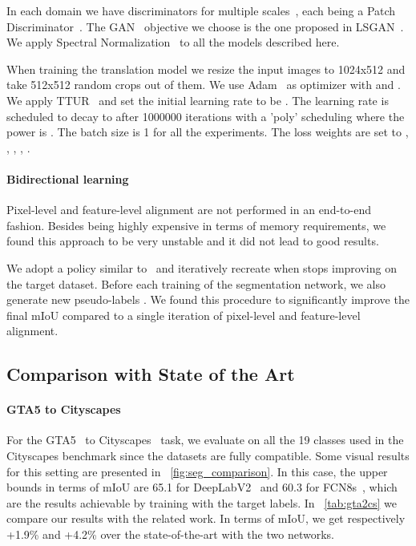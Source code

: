 \documentclass{bmvc2k}
\begin{document}
In each domain we have discriminators for multiple scales~\cite{pix2pixhd}, each being a Patch Discriminator~\cite{pix2pix, li2016precomputed}. The GAN~\cite{gan} objective we choose is the one proposed in LSGAN~\cite{lsgan}. We apply Spectral Normalization~\cite{spectralnorm} to all the models described here.

When training the translation model we resize the input images to 1024x512 and take 512x512 random crops out of them. We use Adam~\cite{adam} as optimizer with  and . We apply TTUR~\cite{ttur} and set the initial learning rate to be . The learning rate is scheduled to decay to  after 1000000 iterations with a 'poly' scheduling where the power is . The batch size is 1 for all the experiments. The loss weights are set to , , , , .

\paragraph{Bidirectional learning}
Pixel-level and feature-level alignment are not performed in an end-to-end fashion. Besides being highly expensive in terms of memory requirements, we found this approach to be very unstable and it did not lead to good results.

We adopt a policy similar to~\cite{bdl} and iteratively recreate  when  stops improving on the target dataset. Before each training of the segmentation network, we also generate new pseudo-labels . We found this procedure to significantly improve the final mIoU compared to a single iteration of pixel-level and feature-level alignment.

\subsection{Comparison with State of the Art}

\paragraph{GTA5 to Cityscapes}
For the GTA5~\cite{gta} to Cityscapes~\cite{cityscapes} task, we evaluate on all the 19 classes used in the Cityscapes benchmark since the datasets are fully compatible. Some visual results for this setting are presented in \figurename~\ref{fig:seg_comparison}. In this case, the upper bounds in terms of mIoU are 65.1 for DeepLabV2~\cite{deeplab} and 60.3 for FCN8s~\cite{fcn}, which are the results achievable by training with the target labels. In \tablename~\ref{tab:gta2cs} we compare our results with the related work. In terms of mIoU, we get respectively +1.9\% and +4.2\% over the state-of-the-art with the two networks.
\end{document}
